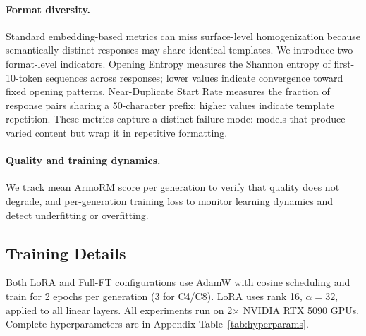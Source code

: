 \paragraph{Format diversity.} Standard embedding-based metrics can miss surface-level homogenization because semantically distinct responses may share identical templates. We introduce two format-level indicators. Opening Entropy measures the Shannon entropy of first-10-token sequences across responses; lower values indicate convergence toward fixed opening patterns. Near-Duplicate Start Rate measures the fraction of response pairs sharing a 50-character prefix; higher values indicate template repetition. These metrics capture a distinct failure mode: models that produce varied content but wrap it in repetitive formatting.

\paragraph{Quality and training dynamics.} We track mean ArmoRM score per generation to verify that quality does not degrade, and per-generation training loss to monitor learning dynamics and detect underfitting or overfitting.

\subsection{Training Details}
\label{sec:training_details}

Both LoRA and Full-FT configurations use AdamW \cite{placeholder_adamw} with cosine scheduling and train for 2 epochs per generation (3 for C4/C8). LoRA uses rank 16, $\alpha{=}32$, applied to all linear layers. All experiments run on 2$\times$ NVIDIA RTX 5090 GPUs. Complete hyperparameters are in Appendix Table~\ref{tab:hyperparams}.